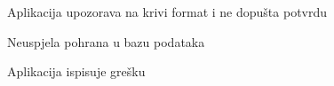 \begin{packed_item}
\begin{packed_item}
\begin{packed_enum}
    							\item Aplikacija upozorava na krivi format i ne dopušta potvrdu
    							
    						\end{packed_enum}
    						\item[5.a] Neuspjela pohrana u bazu podataka
    						\item[] \begin{packed_enum}
    							
    							\item Aplikacija ispisuje grešku
    							
    						\end{packed_enum}
    						
    					\end{packed_item}
    				\end{packed_item}
    				\noindent {}
